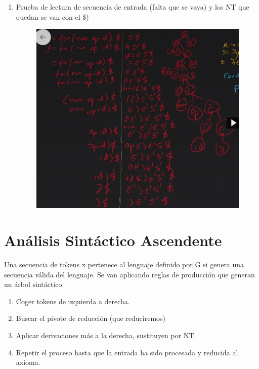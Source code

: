 \documentclass[12pt, twoside, openright]{report} %
\begin{document}
\begin{enumerate}
\item
  Prueba de lectura de secuencia de entrada (falta que se vaya) y los
  NT que quedan se van con el \$)

\begin{figure}[H]
	{\includegraphics[scale=.23]{image-20210320111752355.png}}
\end{figure}
  
\end{enumerate}

\section{Análisis Sintáctico Ascendente}

Una secuencia de tokens x pertenece al lenguaje definido por G si genera una secuencia válida del lenguaje. Se van aplicando reglas de producción que generan un árbol sintáctico.

\begin{enumerate}
  \item Coger tokens de izquierda a derecha.
  \item Buscar el pivote de reducción (que reduciremos)
  \item Aplicar derivaciones más a la derecha, sustituyen por NT.
  \item Repetir el proceso hasta que la entrada ha sido procesada y reducida al axioma.
\end{enumerate}
\end{document}
